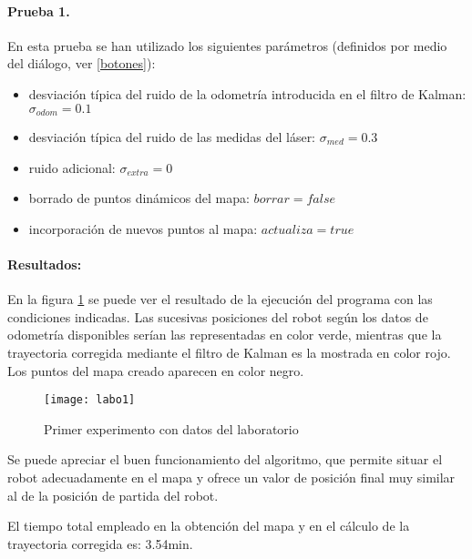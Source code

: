 \paragraph{Prueba 1.}
En esta prueba se han utilizado los siguientes parámetros (definidos por medio del diálogo, ver \ref{botones}):
\begin{itemize}
  \item desviación típica del ruido de la odometría introducida en el filtro de Kalman: $\sigma_{odom} = 0.1$
  \item desviación típica del ruido de las medidas del láser: $\sigma_{med} = 0.3$
  \item ruido adicional: $\sigma_{extra} = 0$
  \item borrado de puntos dinámicos del mapa: $borrar = false$
  \item incorporación de nuevos puntos al mapa: $actualiza = true$
\end{itemize}


\paragraph{Resultados:}

En la figura \ref{fg:labo1} se puede ver el resultado de la ejecución del programa con las condiciones indicadas. Las sucesivas posiciones del robot según los datos de odometría disponibles serían las representadas en color verde, mientras que la trayectoria corregida mediante el filtro de Kalman es la mostrada en color rojo. Los puntos del mapa creado aparecen en color negro.
\vspace{0.2cm}

\begin{figure}[h]
  \centering\texttt{[image: labo1]}\\
  \caption{Primer experimento con datos del laboratorio}\label{fg:labo1}
\end{figure}

Se puede apreciar el buen funcionamiento del algoritmo, que permite situar el robot adecuadamente en el mapa y ofrece un valor de posición final muy similar al de la posición de partida del robot.

El tiempo total empleado en la obtención del mapa y en el cálculo de la trayectoria corregida es: 3.54min.

